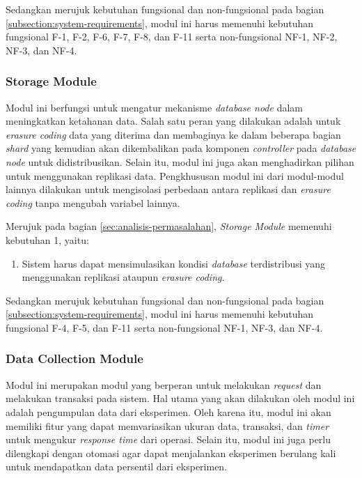 Sedangkan merujuk kebutuhan fungsional dan non-fungsional pada bagian \ref{subsection:system-requirements}, modul ini harus memenuhi kebutuhan fungsional F-1, F-2, F-6, F-7, F-8, dan F-11 serta non-fungsional NF-1, NF-2, NF-3, dan NF-4.

\subsubsection{Storage Module}
\label{subsubsection:storage-module}

Modul ini berfungsi untuk mengatur mekanisme \textit{database node} dalam meningkatkan ketahanan data. Salah satu peran yang dilakukan adalah  untuk \textit{erasure coding} data yang diterima dan membaginya ke dalam beberapa bagian \textit{shard} yang kemudian akan dikembalikan pada komponen \textit{controller} pada \textit{database node} untuk didistribusikan. Selain itu, modul ini juga akan menghadirkan pilihan untuk menggunakan replikasi data. Pengkhususan modul ini dari modul-modul lainnya dilakukan untuk mengisolasi perbedaan antara replikasi dan \textit{erasure coding} tanpa mengubah variabel lainnya.

Merujuk pada bagian \ref{sec:analisis-permasalahan}, \textit{Storage Module} memenuhi kebutuhan 1, yaitu:

\begin{enumerate}
    \item Sistem harus dapat mensimulasikan kondisi \textit{database} terdistribusi yang menggunakan replikasi ataupun \textit{erasure coding}.
\end{enumerate}

Sedangkan merujuk kebutuhan fungsional dan non-fungsional pada bagian \ref{subsection:system-requirements}, modul ini harus memenuhi kebutuhan fungsional F-4, F-5, dan F-11 serta non-fungsional NF-1, NF-3, dan NF-4.

\subsubsection{Data Collection Module}
\label{subsubsection:data-collection-module}

Modul ini merupakan modul yang berperan untuk melakukan \textit{request} dan melakukan transaksi pada sistem. Hal utama yang akan dilakukan oleh modul ini adalah pengumpulan data dari eksperimen. Oleh karena itu, modul ini akan memiliki fitur yang dapat memvariasikan ukuran data, transaksi, dan \textit{timer} untuk mengukur \textit{response time} dari operasi. Selain itu, modul ini juga perlu dilengkapi dengan otomasi agar dapat menjalankan eksperimen berulang kali untuk mendapatkan data persentil dari eksperimen.

